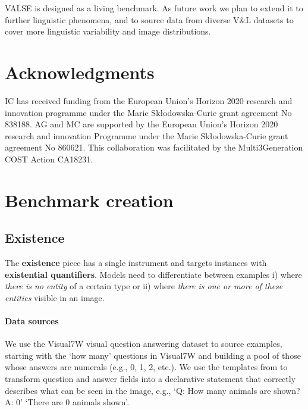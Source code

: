 \documentclass[11pt]{article}
\newcommand{\dataset}{VALSE}
\begin{document}
\dataset{} is designed as a living benchmark. As future work we plan to extend it to further linguistic phenomena, and to source data from diverse V\&L datasets to cover more linguistic variability and image distributions.

\section*{Acknowledgments}
IC has received funding from the European Union’s Horizon 2020 research and innovation programme under the Marie Sk\l{}odowska-Curie grant agreement No 838188. 
AG and MC are supported by the European Union's Horizon 2020 research and innovation Programme under the Marie Sk\l{}odowska-Curie grant agreement No 860621. 
This collaboration was facilitated by the Multi3Generation COST Action CA18231.




\clearpage
\appendix

\section{Benchmark creation}\label{app:benchmark}

\subsection{Existence}\label{app:existence}

The {\bf existence} piece has a single instrument and targets instances with \textbf{existential quantifiers}.
Models need to differentiate between examples i) where \textit{there is no entity} of a certain type or ii) where \textit{there is one or more of these entities} visible in an image.

\paragraph{Data sources}
We use the Visual7W visual question answering dataset \citep{zhu2016cvpr} to source examples, starting with the `how many' questions in Visual7W and building a pool of those whose answers are numerals (e.g., 0, 1, 2, etc.).
We use the templates from \citet{parcalabescu2021seeing} to transform question and answer fields into a declarative statement that correctly describes what can be seen in the image, e.g., `Q: How many animals are shown? A: 0'  `There are 0 animals shown'.
\end{document}
